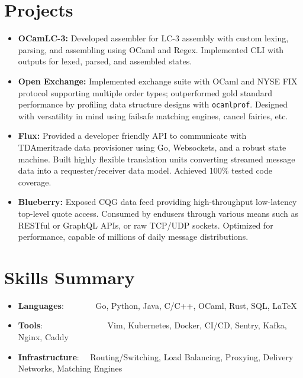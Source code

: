\documentclass[a4paper,11pt]{extarticle}
\newcommand{\resumeSkillItem}[2]{
	\item\small{
		\textbf{#1}{: #2 \vspace{-2pt}}
	}
}
\newcommand{\resumeSubItem}[2]{\resumeSkillItem{#1}{#2}\vspace{-5pt}}
\newcommand{\resumeSubHeadingListStart}{
    \begin{itemize}[leftmargin=0.15in,label={}]}
\newcommand{\resumeSubHeadingListEnd}{\end{itemize}}
\begin{document}
\section{Projects}
    \noindent
    \begin{itemize}
        \vspace{-1.5mm}
        \item{\textbf{OCamLC-3:} Developed assembler for LC-3 assembly with
                custom lexing, parsing, and assembling using OCaml and Regex.
                Implemented CLI with outputs for lexed, parsed, and
                assembled states.
        }
        \vspace{-1mm}
        \item{\textbf{Open Exchange:} Implemented exchange suite with OCaml 
                and NYSE FIX protocol supporting multiple order types;
                outperformed gold standard performance by profiling data
                structure designs with \texttt{ocamlprof}. Designed with
                versatility in mind using failsafe matching engines, cancel
                fairies, etc.
        }
        \vspace{-1mm}
        \item{\textbf{Flux:} Provided a developer friendly API to communicate
                with TDAmeritrade data provisioner using Go, Websockets, and
                a robust state machine. Built highly flexible translation units
                converting streamed message data into a requester/receiver 
                data model. Achieved 100\% tested code coverage.
        }
        \vspace{-1mm}
        \item{\textbf{Blueberry:} Exposed CQG data feed providing
            high-throughput low-latency top-level quote access. Consumed
            by endusers through various means such as RESTful or GraphQL APIs,
            or raw TCP/UDP sockets. Optimized for performance, capable of
            millions of daily message distributions.
        }
    \end{itemize}

\section{Skills Summary}
	\resumeSubHeadingListStart
		\resumeSubItem{Languages}
			{\hspace{0.6mm}~~~~~~~Go, Python, Java, C/C++, OCaml, Rust, SQL,
                \LaTeX}
		\resumeSubItem{Tools}
            {\hspace{0.3mm}~~~~~~~~~~~~~~~Vim, Kubernetes, Docker, CI/CD,
                Sentry, Kafka, Nginx, Caddy}
		\resumeSubItem{Infrastructure}
			{~~Routing/Switching, Load Balancing, Proxying, Delivery Networks,
			 Matching Engines}


        \begin{comment}
		\resumeSubItem{Finance}
			{\hspace{0.7mm}~~~~~~~~~~~Futures, Options, Stochastics, Hypothesis
				Testing, Commodities, Volatility}
        \end{comment}


	\resumeSubHeadingListEnd
\end{document}
